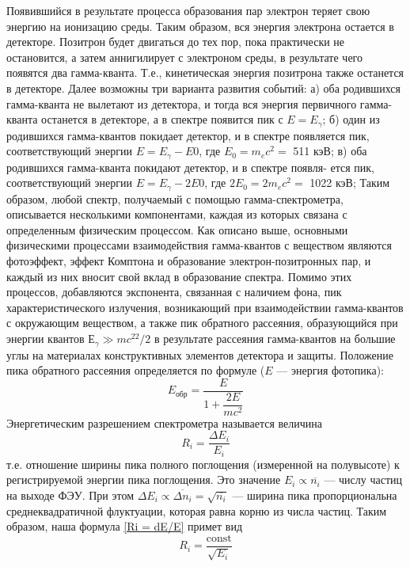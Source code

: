 \documentclass[a4paper,12pt]{article} %
\begin{document}
		Появившийся в результате процесса образования пар электрон теряет свою энергию на ионизацию среды. Таким образом, вся энергия электрона остается в детекторе. Позитрон будет двигаться до тех пор, пока практически не остановится, а затем аннигилирует с электроном среды, в результате чего появятся два гамма-кванта. Т.е., кинетическая энергия позитрона также останется в детекторе. Далее возможны три варианта развития событий:	
		а) оба родившихся гамма-кванта не вылетают из детектора, и тогда вся энергия первичного гамма-кванта останется в детекторе, а в спектре появится пик с $ E = E_\gamma $;
		б) один из родившихся гамма-квантов покидает детектор, и в спектре появляется пик, соответствующий энергии $  E = E_\gamma - E0 $, где $ E_0 = m_ec^2 = $ 511 кэВ;
		в) оба родившихся гамма-кванта покидают детектор, и в спектре появля- ется пик, соответствующий энергии $  E = E_\gamma - 2E0 $, где $ 2E_0 = 2m_ec^2 = $ 1022 кэВ;
		Таким образом, любой спектр, получаемый с помощью гамма-спектрометра, описывается несколькими компонентами, каждая из которых связана с определенным физическим процессом. 
		Как описано выше, основными физическими процессами взаимодействия гамма-квантов с веществом являются фотоэффект, эффект Комптона и образование электрон-позитронных пар, и каждый из них вносит свой вклад в образование спектра. 
		Помимо этих процессов, добавляются экспонента, связанная с наличием фона, пик характеристического излучения, возникающий при взаимодействии гамма-квантов с окружающим веществом, а также пик обратного рассеяния, образующийся при энергии квантов $ Е_\gamma \gg mc^22/2 $ в результате рассеяния гамма-квантов на большие углы на материалах конструктивных элементов детектора и защиты. 
		Положение пика обратного рассеяния определяется по формуле ($ E $ --- энергия фотопика):
		\begin{equation}\label{Eobr}
			E_{\text{обр}} = \dfrac{E}{1 + \dfrac{2E}{mc^2}}
		\end{equation}
		Энергетическим разрешением спектрометра называется величина
		\begin{equation}\label{Ri = dE/E}
			R_i = \dfrac{\Delta E_i}{E_i}
		\end{equation}
		т.е. отношение ширины пика полного поглощения (измеренной на полувысоте) к регистрируемой энергии пика поглощения. Это значение $ E_i \propto \overline{n_i} $ --- числу частиц на выходе ФЭУ. 
		При этом  $ \Delta E_i \propto \overline{\Delta n_i} = \sqrt{\overline{n_i}} $ --- ширина пика пропорциональна среднеквадратичной флуктуации, которая равна корню из числа частиц. 
		Таким образом, наша формула \eqref{Ri = dE/E} примет вид
		\begin{equation}\label{Ri = c/E}
			R_i = \dfrac{\mathrm{const}}{\sqrt{E_i}}
		\end{equation}
\end{document}

